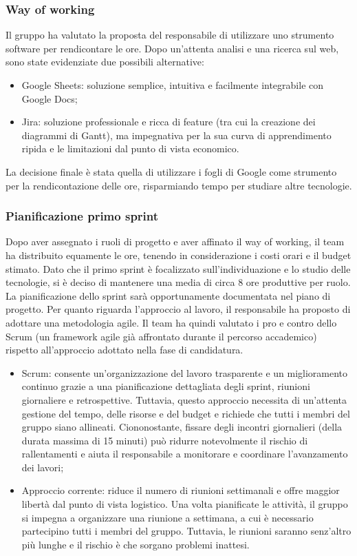 \subsubsection{Way of working}
Il gruppo ha valutato la proposta del responsabile di utilizzare uno strumento software per rendicontare le ore. Dopo un'attenta analisi e una ricerca sul web, sono state evidenziate due possibili alternative:
\begin{itemize}
	\item Google Sheets: soluzione semplice, intuitiva e facilmente integrabile con Google Docs;
	\item Jira: soluzione professionale e ricca di feature (tra cui la creazione dei diagrammi di Gantt), ma impegnativa per la sua curva di apprendimento ripida e le limitazioni dal punto di vista economico.
\end{itemize}
La decisione finale è stata quella di utilizzare i fogli di Google come strumento per la rendicontazione delle ore, risparmiando tempo per studiare altre tecnologie. 

\subsubsection{Pianificazione primo sprint}
Dopo aver assegnato i ruoli di progetto e aver affinato il way of working, il team ha distribuito equamente le ore, tenendo in considerazione i costi orari e il budget stimato. Dato che il primo sprint è focalizzato sull'individuazione e lo studio delle tecnologie, si è deciso di mantenere una media di circa 8 ore produttive per ruolo. La pianificazione dello sprint sarà opportunamente documentata nel piano di progetto. Per quanto riguarda l'approccio al lavoro, il responsabile ha proposto di adottare una metodologia agile. Il team ha quindi valutato i pro e contro dello Scrum (un framework agile già affrontato durante il percorso accademico) rispetto all'approccio adottato nella fase di candidatura.
\begin{itemize}
	\item Scrum: consente un'organizzazione del lavoro trasparente e un miglioramento continuo grazie a una pianificazione dettagliata degli sprint, riunioni giornaliere e retrospettive. Tuttavia, questo approccio necessita di un'attenta gestione del tempo, delle risorse e del budget e richiede che tutti i membri del gruppo siano allineati. Ciononostante, fissare degli incontri giornalieri (della durata massima di 15 minuti) può ridurre notevolmente il rischio di rallentamenti e aiuta il responsabile a monitorare e coordinare l'avanzamento dei lavori;
	\item Approccio corrente: riduce il numero di riunioni settimanali e offre maggior libertà dal punto di vista logistico. Una volta pianificate le attività, il gruppo si impegna a organizzare una riunione a settimana, a cui è necessario partecipino tutti i membri del gruppo. Tuttavia, le riunioni saranno senz'altro più lunghe e il rischio è che sorgano problemi inattesi.
\end{itemize}


